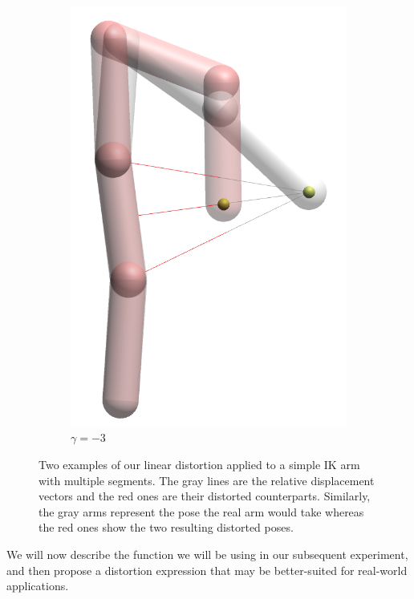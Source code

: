 \begin{figure}[h]
\begin{subfigure}[b]{0.2\textwidth}
        \includegraphics[width=\textwidth]{Figures/simple_distortion_-3.png}
        \caption{$\gamma = -3$}
    \end{subfigure}
    \caption{Two examples of our linear distortion applied to a simple IK arm with multiple segments. The gray lines are the relative displacement vectors and the red ones are their distorted counterparts. Similarly, the gray arms represent the pose the real arm would take whereas the red ones show the two resulting distorted poses.}
    \label{fig:armExamples}
\end{figure}

We will now describe the function we will be using in our subsequent experiment, and then propose a distortion expression that may be better-suited for real-world applications.

